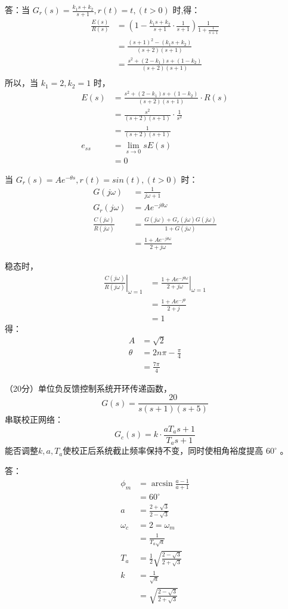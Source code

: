 \onlyanswer
{
	答：当 $G_r(s)=\frac{k_1 s+k_2}{s+1},r(t)=t,(t>0)$ 时,得：
	\begin{align*}
	\frac{E(s)}{R(s)} &= (1-\frac{k_1s+k_2}{s+1}\cdot\frac{1}{s+1})\frac{1}{1+\frac{1}{s+1}} \\
	&=\frac{(s+1)^2-(k_1s+k_2)}{(s+2)(s+1)} \\
	&=\frac{s^2+(2-k_1)s+(1-k_2)}{(s+2)(s+1)} \\
	\end{align*}
	所以，当 $k_1=2,k_2=1$ 时，
	\begin{align*}
	E(s) &=\frac{s^2+(2-k_1)s+(1-k_2)}{(s+2)(s+1)}\cdot R(s) \\
	&=\frac{s^2}{(s+2)(s+1)}\cdot \frac{1}{s^2} \\
	&=\frac{1}{(s+2)(s+1)} \\
	e_{ss} &= \lim_{s\rightarrow 0} sE(s) \\
	&= 0
	\end{align*}
	
	当 $G_r(s)=Ae^{-\theta s},r(t)=sin(t),(t>0)$ 时：
	\begin{align*}
	G(j\omega) &=\frac{1}{j\omega+1} \\
	G_r(j\omega) &=Ae^{-j\theta\omega} \\
	\frac{C(j\omega)}{R(j\omega)} &= \frac{G(j\omega)+G_r(j\omega)G(j\omega)}{1+G(j\omega)} \\
	&=\frac{1+Ae^{-j\theta\omega}}{2+j\omega}
	\end{align*}
	
	稳态时，
	\begin{align*}
	\left.\frac{C(j\omega)}{R(j\omega)}\right|_{\omega=1} &=\left.\frac{1+Ae^{-j\theta\omega}}{2+j\omega}\right|_{\omega=1} \\
	&=\frac{1+Ae^{-j\theta}}{2+j} \\
	&=1 
	\end{align*}
	得：
	\begin{align*}
	A &=\sqrt{2} \\
	\theta &=2n\pi-\frac{\pi}{4}\\
	&=\frac{7\pi}{4}
	\end{align*}
}

\onlytest{\newpage}

\question（20分）单位负反馈控制系统开环传递函数，
$$G(s)=\frac{20}{s(s+1)(s+5)}$$
串联校正网络：
$$G_c(s)=k\cdot\frac{aT_a s+1}{T_a s+1}$$
能否调整$k,a,T_a$使校正后系统截止频率保持不变，同时使相角裕度提高 $60^\circ$ 。

\onlyanswer
{
	答：
	\begin{align*}
	\phi_m &=\arcsin\frac{a-1}{a+1}\\
	&= 60^\circ \\
	a &=\frac{2+\sqrt{3}}{2-\sqrt{3}}\\
	\omega_c &=2=\omega_m\\
	&=\frac{1}{T_a\sqrt{a}}\\
	T_a &=\frac{1}{2}\sqrt{\frac{2-\sqrt{3}}{2+\sqrt{3}}}\\
	k &=\frac{1}{\sqrt{a}}\\
	&=\sqrt{\frac{2-\sqrt{3}}{2+\sqrt{3}}}
	\end{align*}
}



